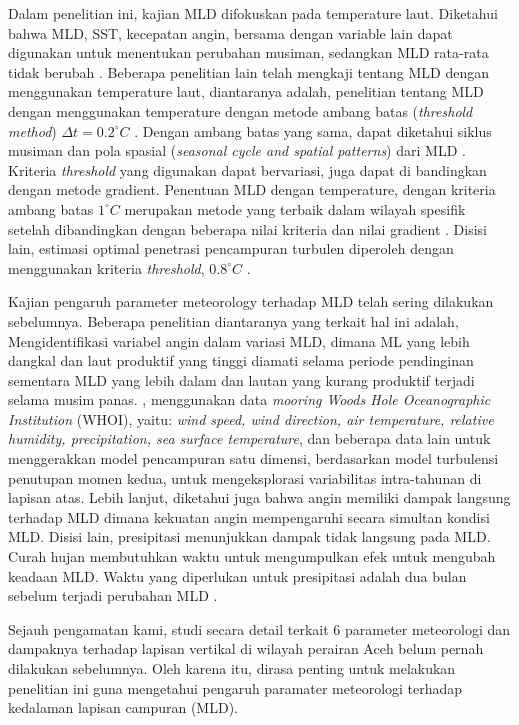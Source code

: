 \begin{spacing}{1.5}
	Dalam penelitian ini, kajian MLD difokuskan pada temperature laut. Diketahui bahwa MLD, SST, kecepatan angin, bersama dengan variable lain dapat digunakan untuk menentukan perubahan musiman, sedangkan MLD rata-rata tidak berubah . Beberapa penelitian lain telah mengkaji tentang MLD dengan menggunakan temperature laut, diantaranya adalah, penelitian tentang MLD dengan menggunakan temperature dengan metode ambang batas (\textit{threshold method}) $\Delta t=0.2^\circ C$ . Dengan ambang batas yang sama, dapat diketahui siklus musiman dan pola spasial (\textit{seasonal cycle and spatial patterns}) dari MLD . Kriteria \textit{threshold} yang digunakan dapat bervariasi, juga dapat di bandingkan dengan metode gradient. Penentuan MLD dengan temperature, dengan kriteria ambang batas  $1^\circ C$ merupakan metode yang terbaik dalam wilayah spesifik setelah dibandingkan dengan beberapa nilai kriteria dan nilai gradient . Disisi lain, estimasi optimal penetrasi pencampuran turbulen diperoleh dengan menggunakan kriteria \textit{threshold}, $0.8^\circ C$ .
	
	Kajian pengaruh parameter meteorology terhadap MLD telah sering dilakukan sebelumnya. Beberapa penelitian diantaranya yang terkait hal ini adalah,  Mengidentifikasi variabel angin dalam variasi MLD, dimana ML yang lebih dangkal dan laut produktif yang tinggi diamati selama periode pendinginan sementara MLD yang lebih dalam dan lautan yang kurang produktif terjadi selama musim panas. , menggunakan data \textit{mooring Woods Hole Oceanographic Institution} (WHOI), yaitu: \textit{wind speed, wind direction, air temperature, relative humidity, precipitation, sea surface temperature}, dan beberapa data lain untuk menggerakkan model pencampuran satu dimensi, berdasarkan model turbulensi penutupan momen kedua, untuk mengeksplorasi variabilitas intra-tahunan di lapisan atas. Lebih lanjut, diketahui juga bahwa angin memiliki dampak langsung terhadap MLD dimana kekuatan angin mempengaruhi secara simultan kondisi MLD. Disisi lain, presipitasi menunjukkan dampak tidak langsung pada MLD. Curah hujan membutuhkan waktu untuk mengumpulkan efek untuk mengubah keadaan MLD. Waktu yang diperlukan untuk presipitasi adalah dua bulan sebelum terjadi perubahan MLD . 
	
	Sejauh pengamatan kami, studi secara detail terkait 6 parameter meteorologi dan dampaknya terhadap lapisan vertikal di wilayah perairan Aceh belum pernah dilakukan sebelumnya. Oleh karena itu, dirasa penting untuk melakukan penelitian ini guna mengetahui pengaruh paramater meteorologi terhadap kedalaman lapisan campuran (MLD).


\end{spacing}
